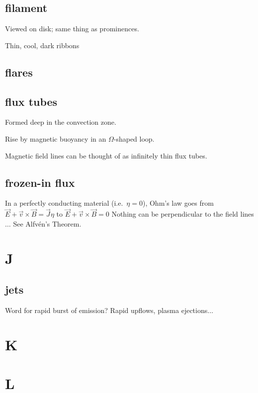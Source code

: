 \documentclass[12pt]{article}
\begin{document}
\subsection*{filament}
    \begin{itemize*}
        \item Viewed on disk; same thing as prominences.
        \item Thin, cool, dark ribbons
    \end{itemize*}

\subsection*{flares}

\subsection*{flux tubes}
    \begin{itemize*}
        \item Formed deep in the convection zone.
        \item Rise by magnetic buoyancy in an $\Omega$-shaped loop.
        \item Magnetic field lines can be thought of as infinitely
          thin flux tubes.
    \end{itemize*}

\subsection*{frozen-in flux}
In a perfectly conducting material (i.e.\ $\eta = 0$),
Ohm's law goes from
$ \vec{E} + \vec{v} \times \vec{B} = \vec{J}\eta $ to
$ \vec{E} + \vec{v} \times \vec{B} = 0 $
Nothing can be perpendicular to the field lines $\ldots$
See Alfv\'en's Theorem.

\section{J}
\subsection*{jets}
Word for rapid burst of emission? Rapid upflows, plasma
ejections$\ldots$

\section{K}
\section{L}
\end{document}
